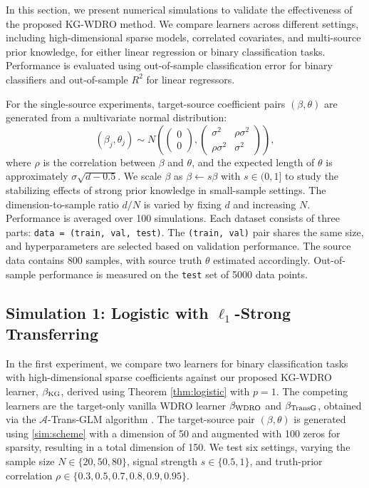 \documentclass[12pt]{article}
\begin{document}
In this section, we present numerical simulations to validate the effectiveness of the proposed KG-WDRO method. We compare learners across different settings, including high-dimensional sparse models, correlated covariates, and multi-source prior knowledge, for either linear regression or binary classification tasks. Performance is evaluated using out-of-sample classification error for binary classifiers and out-of-sample \(R^2\) for linear regressors.

For the single-source experiments, target-source coefficient pairs \((\beta, \theta)\) are generated from a multivariate normal distribution:
\[
\label{sim:scheme}
(\beta_j, \theta_j) \sim N\left( 
\begin{pmatrix} 
0 \\ 
0 
\end{pmatrix}, 
\begin{pmatrix} 
\sigma^2 & \rho\sigma^2 \\ 
\rho\sigma^2 & \sigma^2 
\end{pmatrix}
\right), \tag{3}
\]
where \(\rho\) is the correlation between \(\beta\) and \(\theta\), and the expected length of \(\theta\) is approximately \(\sigma \sqrt{d - 0.5}\). We scale \(\beta\) as \(\beta \gets s\beta\) with \(s \in (0, 1]\) to study the stabilizing effects of strong prior knowledge in small-sample settings. The dimension-to-sample ratio \(d/N\) is varied by fixing \(d\) and increasing \(N\). Performance is averaged over 100 simulations. Each dataset consists of three parts: \texttt{data = (train, val, test)}. The \texttt{(train, val)} pair shares the same size, and hyperparameters are selected based on validation performance. The source data contains 800 samples, with source truth \(\theta\) estimated accordingly. Out-of-sample performance is measured on the \texttt{test} set of 5000 data points.


\subsection{Simulation 1: Logistic with \texorpdfstring{$\ell_1$}{l1}-Strong Transferring}

\label{subsec:sim1}
In the first experiment, we compare two learners for binary classification tasks with high-dimensional sparse coefficients against our proposed KG-WDRO learner, $\beta_{\rm KG}$, derived using Theorem \ref{thm:logistic} with $p=1$. The competing learners are the target-only vanilla WDRO learner $\beta_{\rm WDRO}$ \citep[Theorem 2]{blanchet2019rwpi} and $\beta_{\rm TransG}$, obtained via the $\mathcal{A}$-Trans-GLM algorithm \citep[Algorithm 1]{tian2023transglm}. The target-source pair $(\beta, \theta)$ is generated using \eqref{sim:scheme} with a dimension of 50 and augmented with 100 zeros for sparsity, resulting in a total dimension of 150. We test six settings, varying the sample size $N \in \{20, 50, 80\}$, signal strength $s \in \{0.5, 1\}$, and truth-prior correlation $\rho \in \{0.3, 0.5, 0.7, 0.8, 0.9, 0.95\}$.
\end{document}
